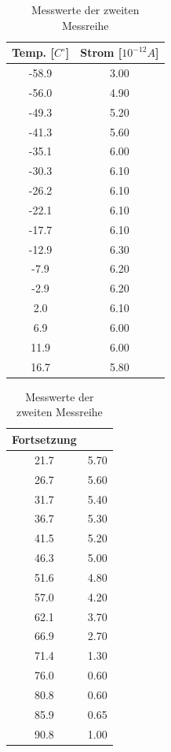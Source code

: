 \begin{table}
\begin{minipage}{0.45\textwidth}
\begin{tabular}{c|c}
Temp. [$C^\circ$] & Strom [$10^{-12}A$]\\\hline
-58.9	&3.00\\\hline
-56.0	&4.90\\\hline
-49.3	&5.20\\\hline
-41.3	&5.60\\\hline
-35.1	&6.00\\\hline
-30.3	&6.10\\\hline
-26.2	&6.10\\\hline
-22.1	&6.10\\\hline
-17.7	&6.10\\\hline
-12.9	&6.30\\\hline
-7.9	&6.20\\\hline
-2.9	&6.20\\\hline
2.0		&6.10\\\hline
6.9		&6.00\\\hline
11.9	&6.00\\\hline
16.7	&5.80\\\hline
\end{tabular}
\end{minipage}
\begin{minipage}{0.45\textwidth}
\begin{tabular}{c|c}
Fortsetzung & \\\hline
21.7	&5.70\\\hline
26.7	&5.60\\\hline
31.7	&5.40\\\hline
36.7	&5.30\\\hline
41.5	&5.20\\\hline
46.3	&5.00\\\hline
51.6	&4.80\\\hline
57.0	&4.20\\\hline
62.1	&3.70\\\hline
66.9	&2.70\\\hline
71.4	&1.30\\\hline
76.0	&0.60\\\hline
80.8	&0.60\\\hline
85.9	&0.65\\\hline
90.8	&1.00\\\hline
\end{tabular}
\end{minipage}
\caption{Messwerte der zweiten Messreihe}
\label{tab_werte2}
\end{table}

